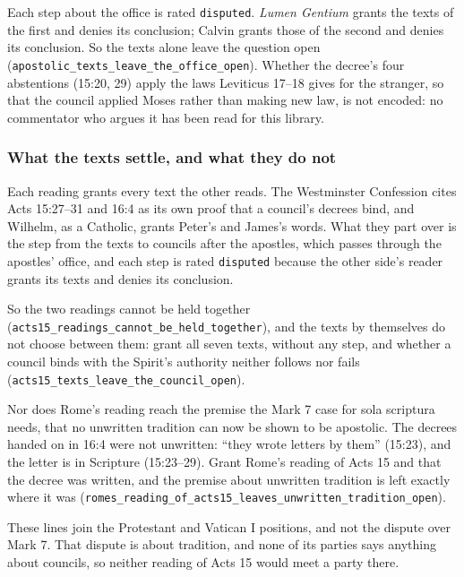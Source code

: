 \documentclass[11pt]{article}
\begin{document}
Each step about the office is rated \texttt{disputed}. \emph{Lumen Gentium} grants the texts of the first and denies its conclusion; Calvin grants those of the second and denies its conclusion. So the texts alone leave the question open (\texttt{apostolic\_\allowbreak{}texts\_\allowbreak{}leave\_\allowbreak{}the\_\allowbreak{}office\_\allowbreak{}open}). Whether the decree’s four abstentions (15:20, 29) apply the laws Leviticus 17–18 gives for the stranger, so that the council applied Moses rather than making new law, is not encoded: no commentator who argues it has been read for this library.

\subsubsection*{What the texts settle, and what they do not}
Each reading grants every text the other reads. The Westminster Confession cites Acts 15:27–31 and 16:4 as its own proof that a council’s decrees bind, and Wilhelm, as a Catholic, grants Peter’s and James’s words. What they part over is the step from the texts to councils after the apostles, which passes through the apostles’ office, and each step is rated \texttt{disputed} because the other side’s reader grants its texts and denies its conclusion.

So the two readings cannot be held together (\texttt{acts15\_\allowbreak{}readings\_\allowbreak{}cannot\_\allowbreak{}be\_\allowbreak{}held\_\allowbreak{}together}), and the texts by themselves do not choose between them: grant all seven texts, without any step, and whether a council binds with the Spirit’s authority neither follows nor fails (\texttt{acts15\_\allowbreak{}texts\_\allowbreak{}leave\_\allowbreak{}the\_\allowbreak{}council\_\allowbreak{}open}).

Nor does Rome’s reading reach the premise the Mark 7 case for sola scriptura needs, that no unwritten tradition can now be shown to be apostolic. The decrees handed on in 16:4 were not unwritten: “they wrote letters by them” (15:23), and the letter is in Scripture (15:23–29). Grant Rome’s reading of Acts 15 and that the decree was written, and the premise about unwritten tradition is left exactly where it was (\texttt{romes\_\allowbreak{}reading\_\allowbreak{}of\_\allowbreak{}acts15\_\allowbreak{}leaves\_\allowbreak{}unwritten\_\allowbreak{}tradition\_\allowbreak{}open}).

These lines join the Protestant and Vatican I positions, and not the dispute over Mark 7. That dispute is about tradition, and none of its parties says anything about councils, so neither reading of Acts 15 would meet a party there.
\end{document}
